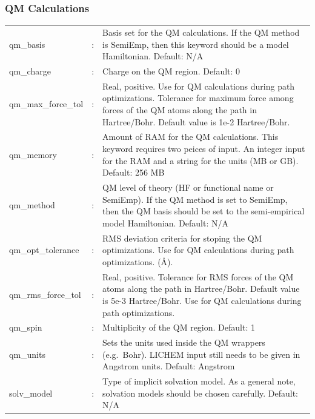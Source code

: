 \documentclass[12pt]{report}
\begin{document}
\subsubsection{QM Calculations}
\begin{center}
\begin{longtable}{ p{4cm} c p{12.5cm}}
qm\_basis & : & Basis set for the QM calculations.
If the QM method is SemiEmp, then this keyword should be a model Hamiltonian.
Default: N/A \newline\\

qm\_charge & : & Charge on the QM region.
Default: 0 \newline\\

qm\_max\_force\_tol & : &
Real, positive. Use for QM calculations
during path optimizations.
Tolerance for maximum force among
forces of the QM atoms
along the path in Hartree/Bohr.
Default value is 1e-2 Hartree/Bohr.\newline \\

qm\_memory & : & Amount of RAM for the QM calculations.
This keyword requires two peices of input.
An integer input for the RAM and a string for the units (MB or GB).
Default: 256 MB \newline\\

qm\_method & : & QM level of theory (HF or functional name or SemiEmp).
If the QM method is set to SemiEmp, then the QM basis should be set to the
semi-empirical model Hamiltonian.
Default: N/A \newline\\

qm\_opt\_tolerance & : &
RMS deviation criteria for stoping the QM optimizations.
Use for QM calculations
during path optimizations.
(\AA).\newline\\

qm\_rms\_force\_tol & : &
Real, positive. Tolerance for RMS forces of the QM atoms
along the path in Hartree/Bohr.
Default value is 5e-3 Hartree/Bohr.
Use for QM calculations
during path optimizations.\newline \\

qm\_spin & : & Multiplicity of the QM region.
Default: 1 \newline\\

qm\_units & : & Sets the units used inside the QM wrappers (e.g.\ Bohr).
LICHEM input still needs to be given in Angstrom units.
Default: Angstrom \newline\\

solv\_model & : & Type of implicit solvation model.
As a general note, solvation models should be chosen carefully.
Default: N/A
\end{longtable}
\end{center}
\vspace{-48pt}
\end{document}
